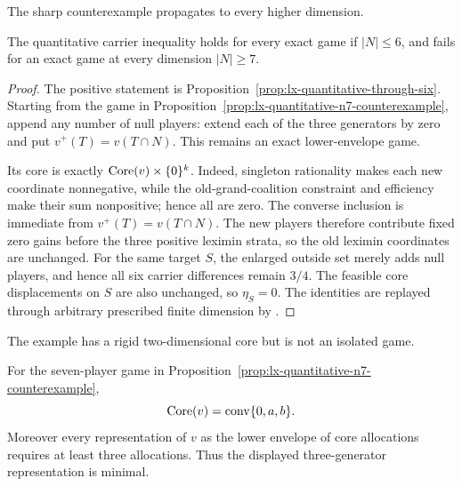 The sharp counterexample propagates to every higher dimension.

\begin{corollary}
\label{cor:lx-quantitative-complete-threshold}
The quantitative carrier inequality holds for every exact game if
$|N|\leq6$, and fails for an exact game at every dimension $|N|\geq7$.
\end{corollary}

\begin{proof}
The positive statement is
Proposition~\ref{prop:lx-quantitative-through-six}.  Starting from the game
in Proposition~\ref{prop:lx-quantitative-n7-counterexample}, append any
number of null players: extend each of the three generators by zero and put
$v^+(T)=v(T\cap N)$.  This remains an exact lower-envelope game.

Its core is exactly $\operatorname{Core}(v)\times\{0\}^k$.  Indeed, singleton rationality
makes each new coordinate nonnegative, while the old-grand-coalition
constraint and efficiency make their sum nonpositive; hence all are zero.
The converse inclusion is immediate from $v^+(T)=v(T\cap N)$.  The new
players therefore contribute fixed zero gains before the three positive
leximin strata, so the old leximin coordinates are unchanged.  For the same
target $S$, the enlarged outside set merely adds null players, and hence all
six carrier differences remain $3/4$.  The feasible core displacements on
$S$ are also unchanged, so $\eta_S=0$.
The identities are replayed through arbitrary prescribed finite dimension by
.
\end{proof}

The example has a rigid two-dimensional core but is not an isolated game.

\begin{proposition}
\label{prop:lx-n7-triangular-core}
For the seven-player game in
Proposition~\ref{prop:lx-quantitative-n7-counterexample},
\[
 \operatorname{Core}(v)=\operatorname{conv}\{0,a,b\}.
\]
Moreover every representation of $v$ as the lower envelope of core
allocations requires at least three allocations.  Thus the displayed
three-generator representation is minimal.
\end{proposition}


